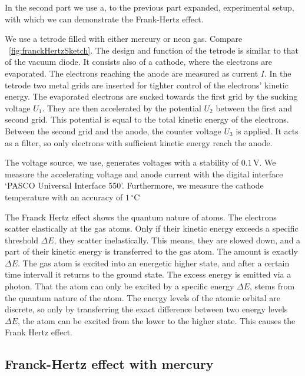\documentclass[a4paper,10pt,twocolumn]{article}
\newcommand{\volt}{\, \mathrm{V}}
\begin{document}
    In the second part we use a, to the previous part expanded, experimental setup,
    with which we can demonstrate the Frank-Hertz effect.
    
    We use a tetrode filled with either mercury or neon gas.
    Compare ~\autoref{fig:franckHertzSketch}.
    The design and function of the tetrode is similar to that of the vacuum diode.
    It consists also of a cathode, where the electrons are evaporated.
    The electrons reaching the anode are measured as current $I$.
    In the tetrode two metal grids are inserted for tighter control of the electrons' kinetic energy.
    The evaporated electrons are sucked towards the first grid by the sucking voltage $U_1$.
    They are then accelerated by the potential $U_2$ between the first and second grid.
    This potential is equal to the total kinetic energy of the electrons.
    Between the second grid and the anode, the counter voltage $U_3$ is applied.
    It acts as a filter, so only electrons with sufficient kinetic energy reach the anode.
    
    The voltage source, we use, generates voltages with a stability of $0.1\volt$.
    We measure the accelerating voltage and anode current with the digital interface `PASCO Universal Interface 550'.
    Furthermore, we measure the cathode temperature with an accuracy of $1 \, ^\circ \mathrm{C}$
    
    The Franck Hertz effect shows the quantum nature of atoms.
    The electrons scatter elastically at the gas atoms.
    Only if their kinetic energy exceeds a specific threshold $\Delta E$, they scatter inelastically.
    This means, they are slowed down, and a part of their kinetic energy is transferred to the gas atom.
    The amount is exactly $\Delta E$.
    The gas atom is excited into an energetic higher state, and after a certain time intervall
    it returns to the ground state.
    The excess energy is emitted via a photon.
    That the atom can only be excited by a specific energy $\Delta E$, stems from the quantum
    nature of the atom.
    The energy levels of the atomic orbital are discrete, so only by transferring the exact difference
    between two energy levels $\Delta E$, the atom can be excited from the lower to the higher state.
    This causes the Frank Hertz effect.
    
    \subsection{Franck-Hertz effect with mercury}
    
\end{document}
